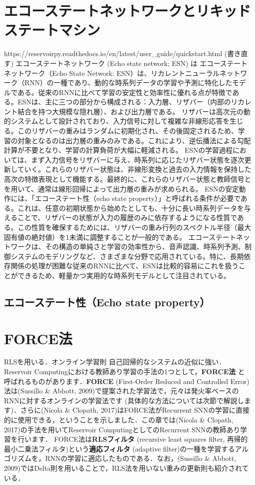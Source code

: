 \section{エコーステートネットワークとリキッドステートマシン}
https://reservoirpy.readthedocs.io/en/latest/user_guide/quickstart.html
(書き直す)
エコーステートネットワーク (Echo state network; ESN) は
エコーステートネットワーク（Echo State Network: ESN）は、リカレントニューラルネットワーク（RNN）の一種であり、動的な時系列データの学習や予測に特化したモデルである。従来のRNNに比べて学習の安定性と効率性に優れる点が特徴である。ESNは、主に三つの部分から構成される：入力層、リザバー（内部のリカレント結合を持つ大規模な隠れ層）、および出力層である。
リザバーは高次元の動的システムとして設計されており、入力信号に対して複雑な非線形応答を生じる。このリザバーの重みはランダムに初期化され、その後固定されるため、学習の対象となるのは出力層の重みのみである。これにより、逆伝播法による勾配計算が不要となり、学習の計算負荷が大幅に軽減される。
ESNの学習過程においては、まず入力信号をリザバーに与え、時系列に応じたリザバー状態を逐次更新していく。これらのリザバー状態は、非線形変換と過去の入力情報を保持した高次の特徴表現として機能する。最終的に、これらのリザバー状態と教師信号とを用いて、通常は線形回帰によって出力層の重みが求められる。
ESNの安定動作には、「エコーステート性（echo state property）」と呼ばれる条件が必要である。これは、任意の初期状態から始めたとしても、十分に長い時系列データを与えることで、リザバーの状態が入力の履歴のみに依存するようになる性質である。この性質を確保するためには、リザバーの重み行列のスペクトル半径（最大固有値の絶対値）を1未満に調整することが一般的である。
エコーステートネットワークは、その構造の単純さと学習の効率性から、音声認識、時系列予測、制御システムのモデリングなど、さまざまな分野で応用されている。特に、長期依存関係の処理が困難な従来のRNNに比べて、ESNは比較的容易にこれを扱うことができるため、軽量かつ実用的な時系列モデルとして注目されている。
\subsection{エコーステート性（Echo state property）}
\section{FORCE法}
RLSを用いる．オンライン学習則
自己回帰的なシステムの近似に強い．
Reservoir Computingにおける教師あり学習の手法の1つとして，\textbf{FORCE法} と呼ばれるものがあります．\textbf{FORCE} (First-Order Reduced and Controlled Error) 法は(Sussillo \& Abbott, 2009)で提案された学習法で，元々は発火率ベースのRNNに対するオンラインの学習法です (具体的な方法については次節で解説します)．さらに(Nicola \& Clopath, 2017)はFORCE法がRecurrent SNNの学習に直接的に使用できる，ということを示しました．この章では(Nicola \& Clopath, 2017)の手法を用いてReservoir ComputingとしてのRecurrent SNNの教師あり学習を行います．
FORCE法は\textbf{RLSフィルタ} (recursive least squares filter, 再帰的最小二乗法フィルタ)という\textbf{適応フィルタ} (adaptive filter)の一種を学習するアルゴリズムを，RNNの学習に適応したものである．なお，(Sussillo \& Abbott, 2009)ではDelta則を用いることで，RLS法を用いない重みの更新則も紹介されている．

